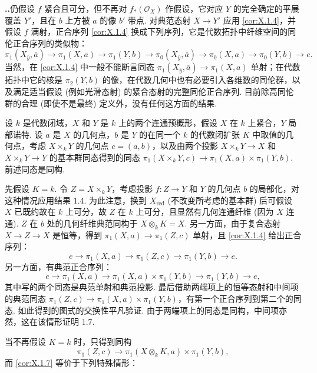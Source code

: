 \noindent\textbf{\thesection..}\quad 仍假设 $f$ 紧合且可分，但不再对 $f_*(\mathcal{O}_X)$ 作假设，它对应 $Y$ 的完全确定的平展覆盖 $Y'$，且在 $b$ 上方被 $a$ 的像 $b'$ 带点. 对典范态射 $X \to Y'$ 应用 \ref{cor:X.1.4}，并假设 $f$ 满射，正合序列 \ref{cor:X.1.4} 换成下列序列，它是代数拓扑中纤维空间的同伦正合序列的类似物：
\[
\pi_1(X_{\overline{y}}, \overline{a}) \longrightarrow \pi_1(X, a) \longrightarrow \pi_1(Y, b) \longrightarrow \pi_0(X_{\overline{y}}, \overline{a}) \longrightarrow \pi_0(X, a) \longrightarrow \pi_0(Y, b) \longrightarrow e.
\]
当然，在 \ref{cor:X.1.4} 中一般不能断言同态 $\pi_1(X_{\overline{y}}, \overline{a}) \to \pi_1(X, a)$ 单射；在代数拓扑中它的核是 $\pi_2(Y, b)$ 的像，在代数几何中也有必要引入各维数的同伦群，以及满足适当假设 (例如光滑态射) 的紧合态射的完整同伦正合序列. 目前除高同伦群的合理 (即使不是最终) 定义外，没有任何这方面的结果.

\begin{corollary}\label{cor:X.1.7}
设 $k$ 是代数闭域，$X$ 和 $Y$ 是 $k$ 上的两个连通预概形，假设 $X$ 在 $k$ 上紧合，$Y$ 局部诺特. 设 $a$ 是 $X$ 的几何点，$b$ 是 $Y$ 的在同一个 $k$ 的代数闭扩张 $K$ 中取值的几何点，考虑 $X \times_k Y$ 的几何点 $c = (a, b)$，以及由两个投影 $X \times_k Y \to X$ 和 $X \times_k Y \to Y$ 的基本群同态得到的同态 $\pi_1(X \times_k Y, c) \to \pi_1(X, a) \times \pi_1(Y, b)$. 前述同态是同构.
\end{corollary}

先假设 $K = k$. 令 $Z = X \times_k Y$，考虑投影 $f \colon Z \to Y$ 和 $Y$ 的几何点 $b$ 的局部化，对这种情况应用结果 1.4. 为此注意，换到 $X_{\mathrm{r\acute{e}d}}$ (不改变所考虑的基本群) 后可假设 $X$ 已既约故在 $k$ 上可分，故 $Z$ 在 $k$ 上可分，且显然有几何连通纤维 (因为 $X$ 连通). $Z$ 在 $b$ 处的几何纤维典范同构于 $X \otimes_k K = X$. 另一方面，由于复合态射 $X \to Z \to X$ 是恒等，得到 $\pi_1(X, a) \to \pi_1(Z, c)$ 单射，且 \ref{cor:X.1.4} 给出正合序列：
\[
e \longrightarrow \pi_1(X, a) \longrightarrow \pi_1(Z, c) \longrightarrow \pi_1(Y, b) \longrightarrow e.
\]
另一方面，有典范正合序列：
\[
e \longrightarrow \pi_1(X, a) \longrightarrow \pi_1(X, a) \times \pi_1(Y, b) \longrightarrow \pi_1(Y, b) \longrightarrow e,
\]
其中写的两个同态是典范单射和典范投影. 最后借助两端项上的恒等态射和中间项的典范同态 $\pi_1(Z, c) \to \pi_1(X, a) \times \pi_1(Y, b)$，有第一个正合序列到第二个的同态. 如此得到的图式的交换性平凡验证. 由于两端项上的同态是同构，中间项亦然，这在该情形证明 1.7.

当不再假设 $K = k$ 时，只得到同构
\[
\pi_1(Z, c) \longrightarrow \pi_1(X \otimes_k K, a) \times \pi_1(Y, b),
\]
而 \ref{cor:X.1.7} 等价于下列特殊情形：


